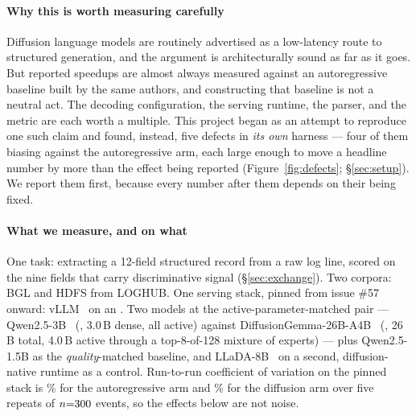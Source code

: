 \paragraph{Why this is worth measuring carefully}
Diffusion language models are routinely advertised as a low-latency route to
structured generation, and the argument is architecturally sound as far as it
goes. But reported speedups are almost always measured against an
autoregressive baseline built by the same authors, and constructing that
baseline is not a neutral act. The decoding configuration, the serving
runtime, the parser, and the metric are each worth a multiple. This project
began as an attempt to reproduce one such claim and found, instead, five
defects in \emph{its own} harness --- four of them biasing against the
autoregressive arm, each large enough to move a headline number by more than
the effect being reported (Figure~\ref{fig:defects}; \S\ref{sec:setup}). We report them first, because
every number after them depends on their being fixed.

\paragraph{What we measure, and on what}
One task: extracting a 12-field structured record from a raw log line, scored
on the nine fields that carry discriminative signal (\S\ref{sec:exchange}).
Two corpora: BGL and HDFS from LOGHUB. One serving stack, pinned from issue
\#57 onward: vLLM \vllmVersion\ on an \gpuModel. Two models at the
active-parameter-matched pair --- Qwen2.5-3B~\cite{qwen25} (\ARthree, 3.0\,B dense, all
active) against DiffusionGemma-26B-A4B~\cite{diffusiongemma} (\DG, 26\,B
total, 4.0\,B active through a top-8-of-128 mixture of experts) --- plus
Qwen2.5-1.5B as the \emph{quality}-matched baseline, and
LLaDA-8B~\cite{llada2025} on a second, diffusion-native runtime as a control. Run-to-run coefficient of variation on the pinned stack
is \arCV\% for the autoregressive arm and \dgCV\% for the diffusion arm over
five repeats of $n{=}300$ events, so the effects below are not noise.

